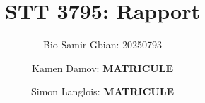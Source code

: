 \documentclass{article}
\title{STT 3795: Rapport}
\author{Bio Samir Gbian: 20250793}
\author{Kamen Damov: \textbf{MATRICULE}}
\author{Simon Langlois: \textbf{MATRICULE}}
\affil{Département de mathématiques et statistiques}
\affil{Université de Montréal}
\begin{document}
\maketitle

\section{}
\end{document}
